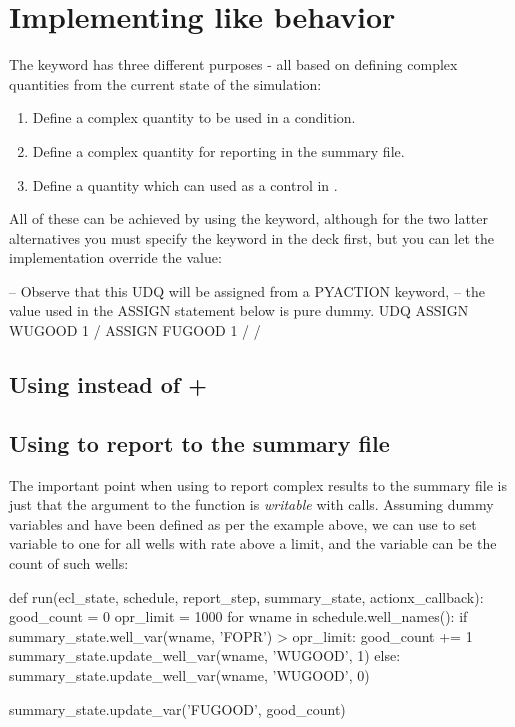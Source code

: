 \section{Implementing \udq{} like behavior}
The \udq{} keyword has three different purposes - all based on defining 
complex quantities from the current state of the simulation:

\begin{enumerate}
\item Define a complex quantity to be used in a \actionx{} condition.
\item Define a complex quantity for reporting in the summary file.
\item Define a quantity which can used as a control in .
\end{enumerate}

All of these can be achieved by using the \pyaction{} keyword, although for the
two latter alternatives you must specify the \udq{} keyword in the deck first,
but you can let the \pyaction{} implementation override the value:
\begin{deck}
-- Observe that this UDQ will be assigned from a PYACTION keyword,
-- the value used in the ASSIGN statement below is pure dummy.
UDQ
  ASSIGN WUGOOD 1 /
  ASSIGN FUGOOD 1 /
/
\end{deck}

\subsection{Using \pyaction{} instead of \udq{} + \actionx{}}



\subsection{Using \pyaction{} to report to the summary file}
The important point when using \pyaction{} to report complex results to the
summary file is just that the  argument to the
 function is \emph{writable} with 
calls. Assuming dummy \udq{} variables  and  have been
defined as per the example above, we can use \pyaction{} to set variable
 to one for all wells with rate above a limit, and the 
variable can be the count of such wells:
\begin{code}
def run(ecl_state, schedule, report_step, summary_state, actionx_callback):
    good_count = 0
    opr_limit = 1000
    for wname in schedule.well_names():
        if summary_state.well_var(wname, 'FOPR') > opr_limit:
            good_count += 1
            summary_state.update_well_var(wname, 'WUGOOD', 1)
        else:
            summary_state.update_well_var(wname, 'WUGOOD', 0)

    summary_state.update_var('FUGOOD', good_count)
\end{code}



